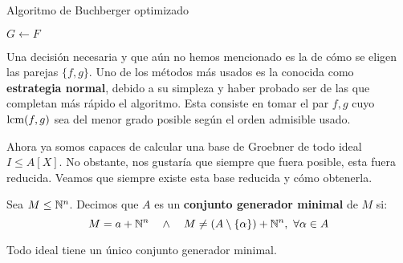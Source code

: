 \begin{algorithm}[hbt!]
    \caption{Algoritmo de Buchberger optimizado}\label{a:buchberger}

    $G\gets F$\;


\end{algorithm}

\begin{observacion}
    Una decisión necesaria y que aún no hemos mencionado es la de cómo se eligen las parejas $\{f,g\}$. Uno de los métodos más usados es la conocida como \textbf{estrategia normal}, debido a su simpleza y haber probado ser de las que completan más rápido el algoritmo. Esta consiste en tomar el par $f,g$ cuyo $\text{lcm}(f,g)$ sea del menor grado posible según el orden admisible usado.
\end{observacion}

Ahora ya somos capaces de calcular una base de Groebner de todo ideal $I\le A[X]$. No obstante, nos gustaría que siempre que fuera posible, esta fuera reducida. Veamos que siempre existe esta base reducida y cómo obtenerla.

\begin{definicion}
    Sea $M\le \mathbb{N}^n$. Decimos que $A$ es un \textbf{conjunto generador minimal} de $M$ si:
    \begin{equation*}
        M = a + \mathbb{N}^n \quad \wedge \quad M\neq (A\setminus \{\alpha\}) + \mathbb{N}^n,\ \forall \alpha \in A 
    \end{equation*}
\end{definicion}

\begin{lema}\label{l:minimal}
    Todo ideal tiene un único conjunto generador minimal.
\end{lema}

